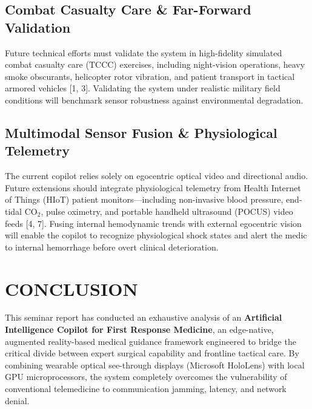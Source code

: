 \documentclass[12pt,a4paper]{report}
\begin{document}
\subsection{Combat Casualty Care \& Far-Forward Validation}
Future technical efforts must validate the system in high-fidelity simulated combat casualty care (TCCC) exercises, including night-vision operations, heavy smoke obscurants, helicopter rotor vibration, and patient transport in tactical armored vehicles [1, 3]. Validating the system under realistic military field conditions will benchmark sensor robustness against environmental degradation.

\subsection{Multimodal Sensor Fusion \& Physiological Telemetry}
The current copilot relies solely on egocentric optical video and directional audio. Future extensions should integrate physiological telemetry from Health Internet of Things (HIoT) patient monitors---including non-invasive blood pressure, end-tidal $\text{CO}_2$, pulse oximetry, and portable handheld ultrasound (POCUS) video feeds [4, 7]. Fusing internal hemodynamic trends with external egocentric vision will enable the copilot to recognize physiological shock states and alert the medic to internal hemorrhage before overt clinical deterioration.

\section{CONCLUSION}

This seminar report has conducted an exhaustive analysis of an \textbf{Artificial Intelligence Copilot for First Response Medicine}, an edge-native, augmented reality-based medical guidance framework engineered to bridge the critical divide between expert surgical capability and frontline tactical care. By combining wearable optical see-through displays (Microsoft HoloLens) with local GPU microprocessors, the system completely overcomes the vulnerability of conventional telemedicine to communication jamming, latency, and network denial.
\end{document}
